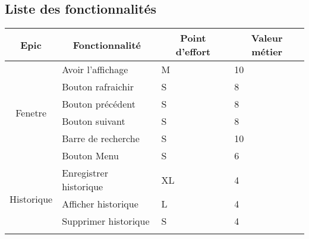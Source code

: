 \documentclass[10pt,a4paper]{article}
\begin{document}
\subsection{Liste des fonctionnalités}
\begin{table}[H]
\begin{tabular}{|c|l|l|l|}
\hline
\textbf{Epic}                           & \multicolumn{1}{c|}{\textbf{Fonctionnalité}} & \multicolumn{1}{c|}{\textbf{Point d'effort}} & \multicolumn{1}{c|}{\textbf{Valeur métier}} \\ \hline
\multirow{6}{*}{Fenetre}                & Avoir l'affichage                            & M                                            & 10                                          \\ \cline{2-4} 
                                        & Bouton rafraichir                            & S                                            & 8                                           \\ \cline{2-4} 
                                        & Bouton précédent                             & S                                            & 8                                           \\ \cline{2-4} 
                                        & Bouton suivant                               & S                                            & 8                                           \\ \cline{2-4} 
                                        & Barre de recherche                           & S                                            & 10                                          \\ \cline{2-4} 
                                        & Bouton Menu                                  & S                                            & 6                                           \\ \hline
\multirow{5}{*}{Historique}             & Enregistrer historique                       & XL                                           & 4                                           \\ \cline{2-4} 
                                        & Afficher historique                          & L                                            & 4                                           \\ \cline{2-4} 
                                        & Supprimer historique                         & S                                            & 4                                           \\ \cline{2-4} 

\end{tabular}
\end{table}
\end{document}
